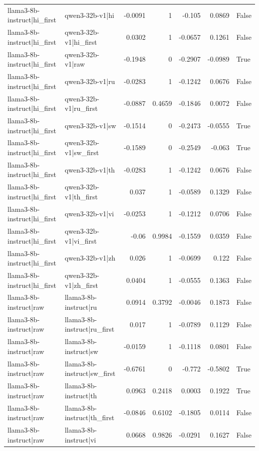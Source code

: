 \begin{table}
\begin{tabular}{l l r r r r l}
llama3-8b-instruct|hi_first & qwen3-32b-v1|hi & -0.0091 & 1 & -0.105 & 0.0869 & False \\
llama3-8b-instruct|hi_first & qwen3-32b-v1|hi_first & 0.0302 & 1 & -0.0657 & 0.1261 & False \\
llama3-8b-instruct|hi_first & qwen3-32b-v1|raw & -0.1948 & 0 & -0.2907 & -0.0989 & True \\
llama3-8b-instruct|hi_first & qwen3-32b-v1|ru & -0.0283 & 1 & -0.1242 & 0.0676 & False \\
llama3-8b-instruct|hi_first & qwen3-32b-v1|ru_first & -0.0887 & 0.4659 & -0.1846 & 0.0072 & False \\
llama3-8b-instruct|hi_first & qwen3-32b-v1|sw & -0.1514 & 0 & -0.2473 & -0.0555 & True \\
llama3-8b-instruct|hi_first & qwen3-32b-v1|sw_first & -0.1589 & 0 & -0.2549 & -0.063 & True \\
llama3-8b-instruct|hi_first & qwen3-32b-v1|th & -0.0283 & 1 & -0.1242 & 0.0676 & False \\
llama3-8b-instruct|hi_first & qwen3-32b-v1|th_first & 0.037 & 1 & -0.0589 & 0.1329 & False \\
llama3-8b-instruct|hi_first & qwen3-32b-v1|vi & -0.0253 & 1 & -0.1212 & 0.0706 & False \\
llama3-8b-instruct|hi_first & qwen3-32b-v1|vi_first & -0.06 & 0.9984 & -0.1559 & 0.0359 & False \\
llama3-8b-instruct|hi_first & qwen3-32b-v1|zh & 0.026 & 1 & -0.0699 & 0.122 & False \\
llama3-8b-instruct|hi_first & qwen3-32b-v1|zh_first & 0.0404 & 1 & -0.0555 & 0.1363 & False \\
llama3-8b-instruct|raw & llama3-8b-instruct|ru & 0.0914 & 0.3792 & -0.0046 & 0.1873 & False \\
llama3-8b-instruct|raw & llama3-8b-instruct|ru_first & 0.017 & 1 & -0.0789 & 0.1129 & False \\
llama3-8b-instruct|raw & llama3-8b-instruct|sw & -0.0159 & 1 & -0.1118 & 0.0801 & False \\
llama3-8b-instruct|raw & llama3-8b-instruct|sw_first & -0.6761 & 0 & -0.772 & -0.5802 & True \\
llama3-8b-instruct|raw & llama3-8b-instruct|th & 0.0963 & 0.2418 & 0.0003 & 0.1922 & True \\
llama3-8b-instruct|raw & llama3-8b-instruct|th_first & -0.0846 & 0.6102 & -0.1805 & 0.0114 & False \\
llama3-8b-instruct|raw & llama3-8b-instruct|vi & 0.0668 & 0.9826 & -0.0291 & 0.1627 & False \\

\end{tabular}
\end{table}
